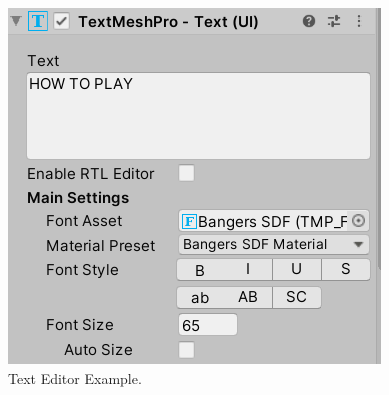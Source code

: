 \begin{figure}[h]
\centering
  \includegraphics[width= 0.8\linewidth]{Images/TextEditor.PNG}
  \caption{Text Editor Example.}
  \label{fig:Text Editor}
\end{figure}

